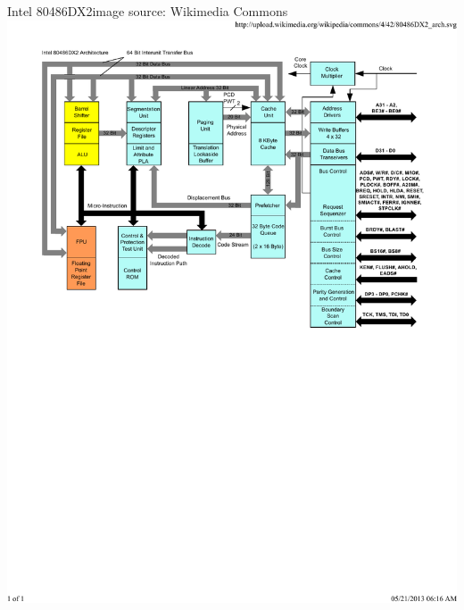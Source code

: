 \documentclass[mathserif,xcolor={dvipsnames,table}]{beamer}
\begin{document}
\begin{frame}{Intel 80486DX2\hfill\tiny{image source: Wikimedia Commons}}
\includegraphics[width=\textwidth]{images/80486DX2.pdf}
\end{frame}
\end{document}
